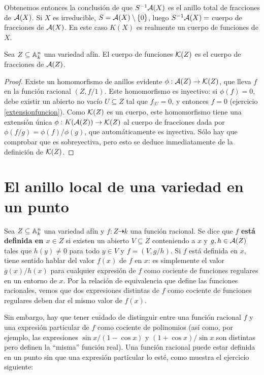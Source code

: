 \documentclass[ACGA.tex]{subfiles}
\begin{document}
Obtenemos entonces la conclusión de que $S^{-1}\mathcal{A}(X)$ es el anillo total de fracciones de $\mathcal{A}(X)$. Si $X$ es irreducible, $S=\mathcal{A}(X)\setminus\{0\}$, luego $S^{-1}\mathcal{A}(X)=$ cuerpo de fracciones de $\mathcal{A}(X)$. En este caso $K(X)$ es realmente un cuerpo de funciones de $X$.

\begin{prop}
 Sea $Z\subseteq \mathbb{A}^n_k$ una variedad afín. El cuerpo de funciones ${\mathcal K}(Z)$ es el cuerpo de fracciones de $\mathcal{A}(Z)$.
\end{prop}

\begin{proof}
 Existe un homomorfismo de anillos evidente $\phi:\mathcal{A}(Z)\to{\mathcal K}(Z)$, que lleva $f$ en la función racional $(Z,f/1)$. Este homomorfismo es inyectivo: si $\phi(f)=0$, debe existir un abierto no vacío $U\subseteq Z$ tal que $f_{|U}=0$, y entonces $f=0$ (ejercicio \ref{extensionfuncion}). Como ${\mathcal K}(Z)$ es un cuerpo, este homomorfismo tiene una extensión única $\phi:K(\mathcal{A}(Z))\to{\mathcal K}(Z)$ al cuerpo de fracciones dada por $\phi(f/g)=\phi(f)/\phi(g)$, que automáticamente es inyectiva. Sólo hay que comprobar que es sobreyectiva, pero esto se deduce inmediatamente de la definición de ${\mathcal K}(Z)$.
\end{proof}



\section{El anillo local de una variedad en un punto}

Sea $Z\subseteq\mathbb{A}^n_k$ una variedad afín y $f:Z\dashrightarrow k$ una función racional. Se dice que $f$ {\bf está definida en $x\in Z$} si existen un abierto $V\subseteq Z$ conteniendo a $x$ y $g,h\in \mathcal{A}(Z)$ tales que $h(y)\neq 0$ para todo $y\in V$ y $f=(V,g/h)$. Si $f$ está definida en $x$, tiene sentido hablar del valor $f(x)$ de $f$ en $x$: es simplemente el valor $g(x)/h(x)$ para cualquier expresión de $f$ como cociente de funciones regulares en un entorno de $x$. Por la relación de equivalencia que define las funciones racionales, vemos que dos expresiones distintas de $f$ como cociente de funciones regulares deben dar el mismo valor de $f(x)$.

Sin embargo, hay que tener cuidado de distinguir entre una función racional $f$ y una expresión particular de $f$ como cociente de polinomios (así como, por ejemplo, las expresiones $\sin x /(1-\cos x)$ y $(1+\cos x)/\sin x$ son distintas pero definen la ``misma'' función real). Una función racional puede estar definida en un punto sin que una expresión particular lo esté, como muestra el ejercicio siguiente:
\end{document}

